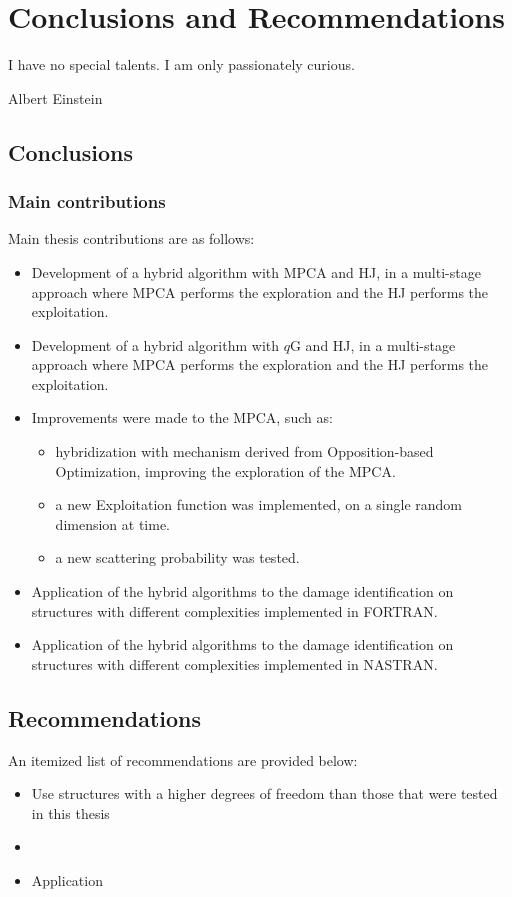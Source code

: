 \chapter{Conclusions and Recommendations}
\label{chp:10}
\epigraph{I have no special talents. I am only passionately curious.}{Albert Einstein}



\section{Conclusions}

\subsection{Main contributions}

Main thesis contributions are as follows:

\begin{itemize}
    \item Development of a hybrid algorithm with MPCA and HJ, in a multi-stage approach where MPCA performs the exploration and the HJ performs the exploitation.
    \item Development of a hybrid algorithm with $q$G and HJ, in a multi-stage approach where MPCA performs the exploration and the HJ performs the exploitation.
    \item Improvements were made to the MPCA, such as:
    \begin{itemize}[topsep=1em]
        \item hybridization with mechanism derived from Opposition-based Optimization, improving the exploration of the MPCA.
        \item a new Exploitation function was implemented, on a single random dimension at time.
        \item a new scattering probability was tested.
    \end{itemize}
    \item Application of the hybrid algorithms to the damage identification on structures with different complexities implemented in FORTRAN.
    \item Application of the hybrid algorithms to the damage identification on structures with different complexities implemented in NASTRAN.
\end{itemize}

\section{Recommendations}

An itemized list of recommendations are provided below:

\begin{itemize}
    \item Use structures with a higher degrees of freedom than those that were tested in this thesis
    \item
    \item Application
\end{itemize}